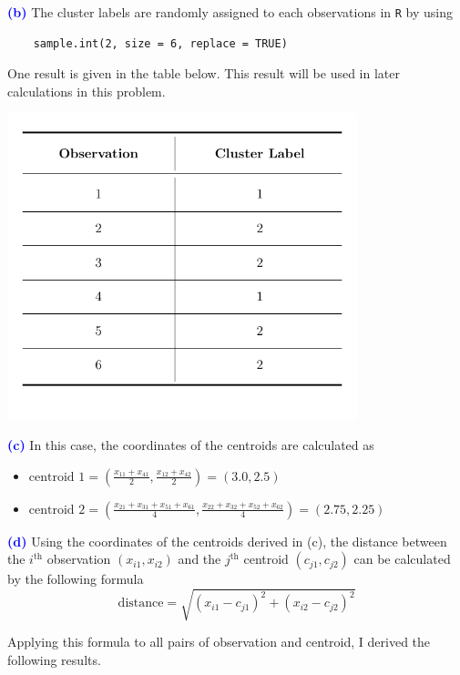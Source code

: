 \documentclass[a4paper,11pt]{article}
\newcommand{\code}[1]{\texttt{#1}}
\newcommand{\qnum}[1]{\noindent\textcolor{blue}{\textbf{(#1)}}}
\newcommand{\ds}{\displaystyle}
\begin{document}
\qnum{b}
The cluster labels are randomly assigned to each observations in \code{R} by using
\begin{verbatim}
    sample.int(2, size = 6, replace = TRUE)
\end{verbatim}
One result is given in the table below. This result will be used in later calculations in this problem.
\begin{center}
  \includegraphics[width=4in]{Table/Table1.pdf}
\end{center}



\qnum{c}
In this case, the coordinates of the centroids are calculated as
\begin{itemize}
\item $
    \text{centroid 1} = 
    \left(
        \ds\frac{x_{11} + x_{41}}{2},
        \frac{x_{12} + x_{42}}{2}
    \right)
    = (3.0, 2.5)
$
\item $
    \text{centroid 2} = 
    \left(
        \ds\frac{x_{21} + x_{31} + x_{51} + x_{61}}{4},
        \frac{x_{22} + x_{32} + x_{52} + x_{62}}{4}
    \right)
    = (2.75, 2.25)
$
\end{itemize}
\bigskip



\qnum{d}
Using the coordinates of the centroids derived in (c), the distance between the $i^\text{th}$ observation $(x_{i1}, x_{i2})$ and the $j^\text{th}$ centroid $(c_{j1}, c_{j2})$ can be calculated by the following formula
\[
    \text{distance} = 
    \sqrt{
        (x_{i1} - c_{j1})^2 + (x_{i2} - c_{j2})^2
    }
\]

Applying this formula to all pairs of observation and centroid, I derived the following results. 
\end{document}
